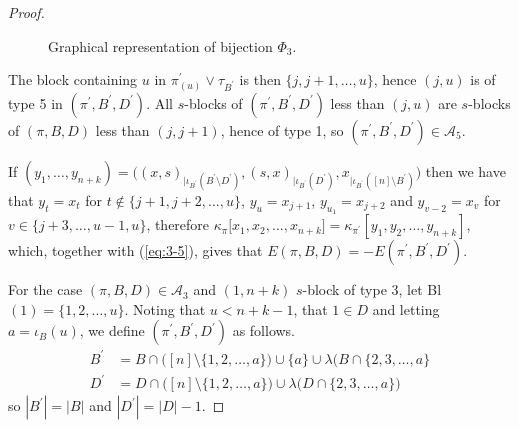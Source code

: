 \documentclass{amsart}
\begin{document}
\begin{proof}
\begin{center}
{\begin{figure}[H]
   	\caption{Graphical representation of bijection $\Phi_3$.}
   	\label{fig:6}
   	\end{figure}
   }
   \end{center}
 The block containing $u $ in $ \pi^{\prime}_ {(u)} \vee \tau_{B^\prime}$ is then $\{j, j+1, \dots, u\} $, hence $ (j, u)$ is of type 5 in 
 $(\pi^\prime, B^\prime, D^\prime)$.
 All $s$-blocks of $(\pi^\prime, B^\prime, D^\prime)$ less than $(j, u)$ are $s$-blocks of $(\pi, B, D)$ less than $(j, j+1)$, hence of type 1, so $(\pi^\prime, B^\prime, D^\prime) \in \mathcal{A}_5$.
 
 If $(y_1, \dots, y_{n+k}) =
 \big(
 (x, s)_{ | \iota_{B^\prime} (B^\prime \setminus D^\prime)} , (s, x)_{| \iota_{B^\prime} (D^\prime)} , x_{| \iota_{B^\prime}([n] \setminus {B^\prime} )}
 \big) $
 then we have that 
 $y_t = x_t$
 for $ t \notin \{j+1, j+2, \dots, u\} $,
 $ y_u = x_{j+1}$,
 $y_{u_1}= x_{j+2} $
 and 
 $ y_{v-2}= x_v $
 for 
 $ v \in \{j+3, \dots, u-1, u\}$,
 therefore
 $\kappa_\pi\big[x_1, x_2, \dots, x_{n+k}] = \kappa_{\pi^\prime}[ y_1, y_2, \dots, y_{n+k}]$, which, together with (\ref{eq:3-5}), gives that
 $ E(\pi, B, D) = -E(\pi^\prime, B^\prime, D^\prime)$.
 
 For the case $(\pi, B, D) \in \mathcal{A}_3 $ and $ (1, n+k)$  $s$-block of type 3, let 
 \textrm{Bl}$(1) = \{1, 2, \dots, u\}$.
  Noting that $u < n +k-1 $, that $1 \in  D $
  and letting $a = \iota_B(u)$, we define
   $(\pi^\prime, B^\prime, D^\prime)$ 
   as follows.
   \begin{align*}
   B^\prime & = 
   B \cap \big([n]\setminus \{ 1, 2,\dots, a \}  \big) 
   \cup\{a\} \cup \lambda\big(B \cap \{ 2, 3, \dots, a \}\\
   D^\prime & =
   D \cap \big( [n]\setminus \{ 1, 2,\dots, a \}  \big) 
   \cup \lambda \big( D \cap \{ 2, 3, \dots, a\} \big)
   \end{align*}
  so $ | B^\prime | = | B | $ and 
  $ | D^\prime | = | D | - 1 $.
 

\end{proof}
\end{document}
